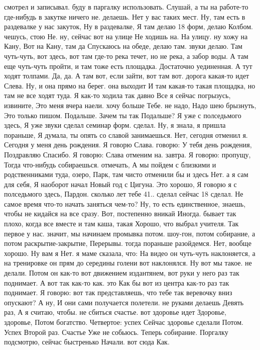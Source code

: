 \I
смотрел и записывал.
буду в паргалку использовать.
Слушай, а ты на работе-то где-нибудь в закутке ничего не.
делаешь. Нет у вас таких мест. Ну, там есть в раздевалке у нас закуток, Ну в раздевалке, Я там
делаю 18 форм, делаю Колбом.
чешусь, стою Не. ну, сейчас вот на улице Не ходишь на.
На улицу. ну хожу на Кану, Вот на Кану, там да Спускаюсь на обеде, делаю там.
звуки делаю.
Там чуть-чуть, вот здесь, вот там где-то река течет, но не река, а забор воды.
А там еще чуть-чуть пройти, и там тоже есть площадка.
Достаточно уединенная.
А тут ходят толпами.
Да, да.
А там вот, если зайти, вот там вот.
дорога какая-то идет Слева.
Ну, и она прямо на берег.
она выходит И там какая-то такая площадка, но там не все ходят туда. Я как-то ходила так давно Все я сейчас погрызусь, извините, Это меня вчера наели.
хочу больше Тебе. не надо, Надо шею брызнуть, Это только пишом.
Подальше. Зачем ты так Подальше?
Я уже с полседьмого здесь, Я уже
звуки сделал семинар форм.
сделал. Ну, я знала, я пришла пораньше, Я думала, ты опять со славой занимаешься.
Нет, сегодня отменил я. Сегодня у меня день рождения. Я говорю Слава.
говорю: У тебя день рождения, Поздравляю Спасибо.
Я говорю: Слава отменим на.
завтра. Я говорю: пропущу, Тогда что-нибудь собираешься.
отмечать, А мы пойдем с близкими и родственниками туда, озеро, Парк, там чисто отменили бы и здесь Нет. а я сам для себя, Я наоборот начал Новый год с Цигуна. Это хорошо, Я говорю я с полседьмого здесь, Пардон.
сколько лет тебе 41.. сделал сейчас 18 сделал. Не самое время что-то начать заняться чем-то? Ну, то есть единственное, знаешь, чтобы не кидайся на все сразу. Вот, постепенно вникай Иногда.
бывает так плохо, когда все вместе и там каша, такая Хорошо, что выбрал учителя. Так первое у нас.
значит, мы начинаем промывка потом.
шоу-гон, потом собирание, а потом раскрытие-закрытие, Перерывы.
тогда пораньше разойдемся. Нет, вообще хорошо. Ну вам я Нет. я маме сказала, что:
На видео он чуть-чуть наклоняется, а на тренировке он прям до середины голени вот наклонялся. Ну вот мы такое.
не делали. Потом он как-то вот движением издантянем, вот руки у него раз так поднимает.
А вот так как-то как.
это Как бы вот из центра как-то раз так поднимает. Я говорю: вот так представляешь, что тебе так веревочку вниз опускают? А ну, И они сами получается полетели.
не руками делаешь Девять раз, А я считаю, чтобы.
не сбиться счастье. вот здоровье идет Здоровье, здоровье, Потом богатство. Четвертое:
успех Сейчас здоровье сделали Потом.
Успех Второй раз. Счастье Уже не собьюсь.
Теперь собирание. Поргалку подсмотрю, сейчас быстренько Начали.
вот сюда Как.
